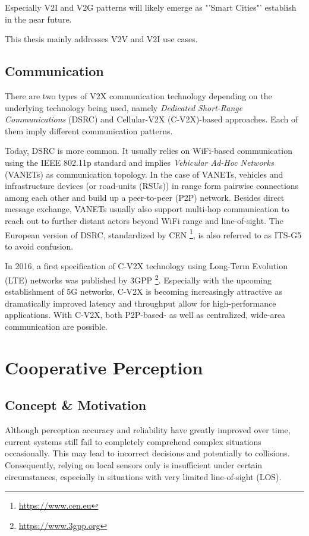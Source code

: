 Especially V2I and V2G patterns will likely emerge as "'Smart Cities"' establish in the near future.

This thesis mainly addresses V2V and V2I use cases.

\subsection{Communication}
\label{subsec:background:communication}
There are two types of V2X communication technology depending on the underlying technology being used, namely \textit{Dedicated Short-Range Communications} (DSRC) and Cellular-V2X (C-V2X)-based approaches. Each of them imply different communication patterns.

Today, DSRC is more common. It usually relies on WiFi-based communication using the IEEE 802.11p standard and implies \textit{Vehicular Ad-Hoc Networks} (VANETs) as communication topology. In the case of VANETs, vehicles and infrastructure devices (or road-units (RSUs)) in range form pairwise connections among each other and build up a peer-to-peer (P2P) network. Besides direct message exchange, VANETs usually also support multi-hop communication to reach out to further distant actors beyond WiFi range and line-of-sight. The European version of DSRC, standardized by CEN \footnote{\url{https://www.cen.eu}}, is also referred to as ITS-G5 to avoid confusion. 

In 2016, a first specification of C-V2X technology using Long-Term Evolution (LTE) networks was published by 3GPP \footnote{\url{https://www.3gpp.org}}. Especially with the upcoming establishment of 5G networks, C-V2X is becoming increasingly attractive as dramatically improved latency and throughput allow for high-performance applications. With C-V2X, both P2P-based- as well as centralized, wide-area communication are possible. 

\section{Cooperative Perception}
\label{sec:cooperative_perception}

\subsection{Concept \& Motivation}
\label{subsec:background:concept_motivation}
Although perception accuracy and reliability have greatly improved over time, current systems still fail to completely comprehend complex situations occasionally. This may lead to incorrect decisions and potentially to collisions. Consequently, relying on local sensors only is insufficient under certain circumstances, especially in situations with very limited line-of-sight (LOS).

